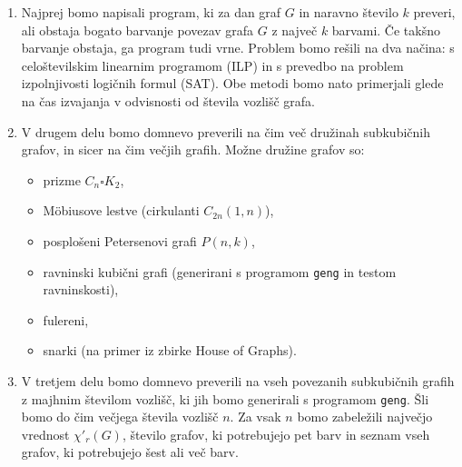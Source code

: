 \documentclass[12pt,a4paper]{article}
\begin{document}
\begin{enumerate}
    \item Najprej bomo napisali program, ki za dan graf $G$ in naravno število $k$ preveri, ali obstaja bogato barvanje povezav grafa $G$ z največ $k$ barvami. Če takšno barvanje obstaja, ga program tudi vrne.
    Problem bomo rešili na dva načina: s celoštevilskim linearnim programom (ILP) in s prevedbo na problem izpolnjivosti logičnih formul (SAT).
    Obe metodi bomo nato primerjali glede na čas izvajanja v odvisnosti od števila vozlišč grafa.

    \item V drugem delu bomo domnevo preverili na čim več družinah subkubičnih grafov, in sicer na čim večjih grafih. Možne družine grafov so:
    \begin{itemize}
        \item prizme $C_n \square K_2$,
        \item Möbiusove lestve (cirkulanti $C_{2n}(1,n)$),
        \item posplošeni Petersenovi grafi $P(n,k)$,
        \item ravninski kubični grafi (generirani s programom \texttt{geng} in testom ravninskosti),
        \item fulereni,
        \item snarki (na primer iz zbirke House of Graphs).
    \end{itemize}

    \item V tretjem delu bomo domnevo preverili na vseh povezanih subkubičnih grafih z majhnim številom vozlišč, ki jih bomo generirali s programom \texttt{geng}. Šli bomo do čim večjega števila vozlišč $n$.
    Za vsak $n$ bomo zabeležili največjo vrednost $\chi'_r(G)$, število grafov, ki potrebujejo pet barv in seznam vseh grafov, ki potrebujejo šest ali več barv.
\end{enumerate}



\end{document}
